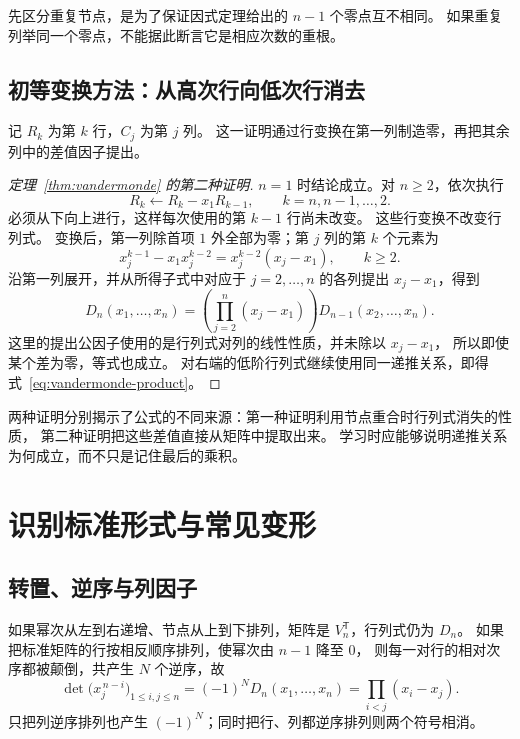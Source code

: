\documentclass[UTF8,12pt,a4paper,fontset=fandol]{ctexart}
\begin{document}
先区分重复节点，是为了保证因式定理给出的 $n-1$ 个零点互不相同。
如果重复列举同一个零点，不能据此断言它是相应次数的重根。

\subsection{初等变换方法：从高次行向低次行消去}

记 $R_k$ 为第 $k$ 行，$C_j$ 为第 $j$ 列。
这一证明通过行变换在第一列制造零，再把其余列中的差值因子提出。

\begin{proof}[定理~\ref{thm:vandermonde} 的第二种证明]
$n=1$ 时结论成立。对 $n\geq2$，依次执行
\[
  R_k\longleftarrow R_k-x_1R_{k-1},\qquad k=n,n-1,\ldots,2.
\]
必须从下向上进行，这样每次使用的第 $k-1$ 行尚未改变。
这些行变换不改变行列式。
变换后，第一列除首项 $1$ 外全部为零；第 $j$ 列的第 $k$ 个元素为
\[
  x_j^{k-1}-x_1x_j^{k-2}=x_j^{k-2}(x_j-x_1),\qquad k\geq2.
\]
沿第一列展开，并从所得子式中对应于 $j=2,\ldots,n$ 的各列提出 $x_j-x_1$，得到
\begin{equation}
  D_n(x_1,\ldots,x_n)
  =\left(\prod_{j=2}^n(x_j-x_1)\right)D_{n-1}(x_2,\ldots,x_n).
  \label{eq:vandermonde-elimination}
\end{equation}
这里的提出公因子使用的是行列式对列的线性性质，并未除以 $x_j-x_1$，
所以即使某个差为零，等式也成立。
对右端的低阶行列式继续使用同一递推关系，即得式~\eqref{eq:vandermonde-product}。
\end{proof}

两种证明分别揭示了公式的不同来源：第一种证明利用节点重合时行列式消失的性质，
第二种证明把这些差值直接从矩阵中提取出来。
学习时应能够说明递推关系为何成立，而不只是记住最后的乘积。

\section{识别标准形式与常见变形}

\subsection{转置、逆序与列因子}

如果幂次从左到右递增、节点从上到下排列，矩阵是 $V_n^{\mathsf T}$，行列式仍为 $D_n$。
如果把标准矩阵的行按相反顺序排列，使幂次由 $n-1$ 降至 $0$，
则每一对行的相对次序都被颠倒，共产生 $N$ 个逆序，故
\begin{equation}
  \det\bigl(x_j^{\,n-i}\bigr)_{1\leq i,j\leq n}
  =(-1)^N D_n(x_1,\ldots,x_n)
  =\prod_{i<j}(x_i-x_j).
  \label{eq:descending-powers}
\end{equation}
只把列逆序排列也产生 $(-1)^N$；同时把行、列都逆序排列则两个符号相消。
\end{document}
